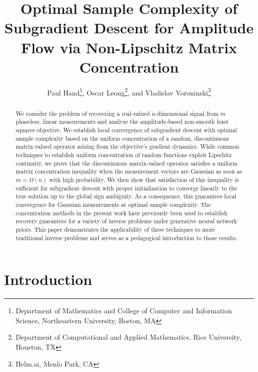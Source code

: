 \documentclass[11pt]{article}
\begin{document}
\title{Optimal Sample Complexity of Subgradient Descent for Amplitude Flow via Non-Lipschitz Matrix Concentration}
\author{Paul Hand\thanks{Department of Mathematics and College of Computer and Information Science, Northeastern University, Boston, MA}, Oscar Leong\thanks{Department of Computational and Applied Mathematics, Rice University, Houston, TX}, and Vladislav Voroninski\thanks{Helm.ai, Menlo Park, CA}}
\maketitle

\begin{abstract}

    
    We consider the problem of recovering a real-valued $n$-dimensional signal from $m$ phaseless, linear measurements and analyze the amplitude-based non-smooth least squares objective. We establish local convergence of subgradient descent with optimal sample complexity based on the uniform concentration of a random, discontinuous matrix-valued operator arising from the objective's gradient dynamics. While common techniques to establish uniform concentration of random functions exploit Lipschitz continuity, we prove that the discontinuous matrix-valued operator satisfies a uniform matrix concentration inequality when the measurement vectors are Gaussian as soon as $m = \Omega(n)$ with high probability. We then show that satisfaction of this inequality is sufficient for subgradient descent with proper initialization to converge linearly to the true solution up to the global sign ambiguity. As a consequence, this guarantees local convergence for Gaussian measurements at optimal sample complexity. The concentration methods in the present work have previously been used to establish recovery guarantees for a variety of inverse problems under generative neural network priors. This paper demonstrates the applicability of these techniques to more traditional inverse problems and serves as a pedagogical introduction to those results.
\end{abstract}
\section{Introduction}
\end{document}
